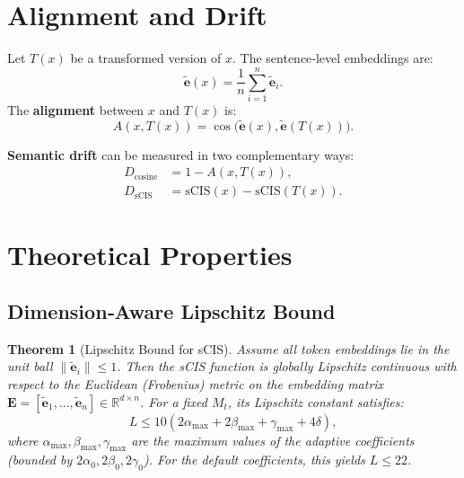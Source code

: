 \documentclass[11pt]{article}
\newtheorem{theorem}{Theorem}
\theoremstyle{definition}
\begin{document}
\section{Alignment and Drift}

Let \(T(x)\) be a transformed version of \(x\). The sentence‑level embeddings are:
\[
\tilde{\mathbf{e}}(x) = \frac{1}{n} \sum_{i=1}^{n} \tilde{\mathbf{e}}_i.
\]
The \textbf{alignment} between \(x\) and \(T(x)\) is:
\begin{equation}
A(x, T(x)) = \cos\big(\tilde{\mathbf{e}}(x), \tilde{\mathbf{e}}(T(x))\big).
\end{equation}

\textbf{Semantic drift} can be measured in two complementary ways:
\begin{align}
D_{\text{cosine}} &= 1 - A(x, T(x)), \\
D_{\text{sCIS}} &= \text{sCIS}(x) - \text{sCIS}(T(x)).
\end{align}

\section{Theoretical Properties}

\subsection{Dimension‑Aware Lipschitz Bound}

\begin{theorem}[Lipschitz Bound for sCIS]\label{thm:lipschitz}
Assume all token embeddings lie in the unit ball \(\|\tilde{\mathbf{e}}_i\| \le 1\). Then the sCIS function is globally Lipschitz continuous with respect to the Euclidean (Frobenius) metric on the embedding matrix \(\mathbf{E} = [\tilde{\mathbf{e}}_1, \dots, \tilde{\mathbf{e}}_n] \in \mathbb{R}^{d \times n}\). For a fixed \(M_t\), its Lipschitz constant satisfies:
\[
L \le 10 \left( 2\alpha_{\max} + 2\beta_{\max} + \gamma_{\max} + 4\delta \right),
\]
where \(\alpha_{\max},\beta_{\max},\gamma_{\max}\) are the maximum values of the adaptive coefficients (bounded by \(2\alpha_0,2\beta_0,2\gamma_0\)). For the default coefficients, this yields \(L \le 22\).
\end{theorem}
\end{document}
